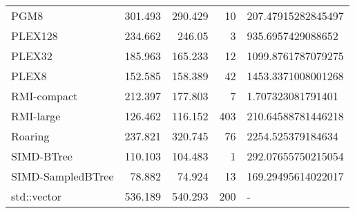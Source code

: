 \begin{tabular}{lrrrl}
 PGM8              &                301.493 &               290.429 &           10 & 207.47915282845497 \\
 PLEX128           &                234.662 &               246.05  &            3 & 935.6957429088652  \\
 PLEX32            &                185.963 &               165.233 &           12 & 1099.8761787079275 \\
 PLEX8             &                152.585 &               158.389 &           42 & 1453.3371008001268 \\
 RMI-compact       &                212.397 &               177.803 &            7 & 1.707323081791401  \\
 RMI-large         &                126.462 &               116.152 &          403 & 210.64588781446218 \\
 Roaring           &                237.821 &               320.745 &           76 & 2254.525379184634  \\
 SIMD-BTree        &                110.103 &               104.483 &            1 & 292.07655750215054 \\
 SIMD-SampledBTree &                 78.882 &                74.924 &           13 & 169.29495614022017 \\
 std::vector       &                536.189 &               540.293 &          200 & -                  \\
\hline
\end{tabular}